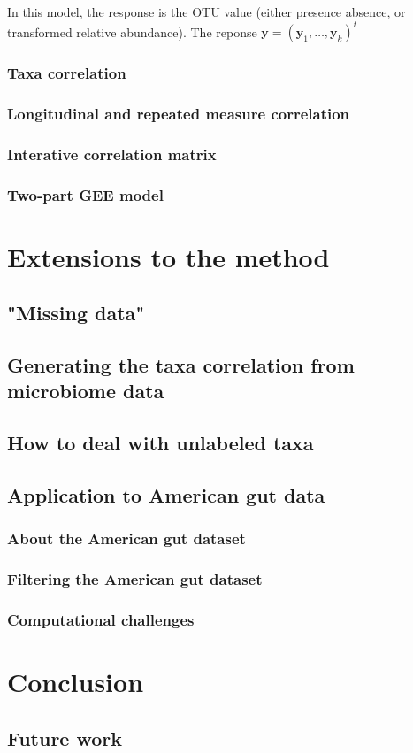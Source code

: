 \documentclass[12pt]{article}
\begin{document}
In this model, the response is the OTU value (either presence absence, or transformed relative abundance). The reponse $\mathbf{y} = (\mathbf{y}_1, \ldots, \mathbf{y}_k)^t$




\subsubsection{Taxa correlation}
\subsubsection{Longitudinal and repeated measure correlation}
\subsubsection{Interative correlation matrix }
\subsubsection{Two-part GEE model}


\section{Extensions to the method}
\subsection{"Missing data"}
\subsection{Generating the taxa correlation from microbiome data}
\subsection{How to deal with unlabeled taxa}
\subsection{Application to American gut data}
\subsubsection{About the American gut dataset}
\subsubsection{Filtering the American gut dataset}
\subsubsection{Computational challenges}


\section{Conclusion}
\subsection{Future work}







\printbibliography
\end{document}
